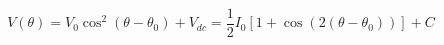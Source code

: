 \begin{equation}
\label{eq:Photodiode_Voltage}
V(\theta) = V_0 \cos^2(\theta - {\theta}_0)+ V_{dc} = \frac{1}{2}I_0\left[1 + \cos(2 (\theta - \theta_0))\right]+ C
\end{equation}